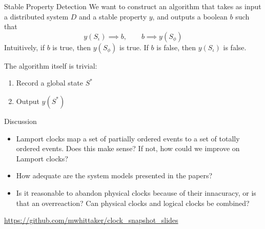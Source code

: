 \begin{frame}
  \begin{center}
    \scalebox{0.7}{
      \begin{tikzpicture}[xscale=3, yscale=1.5]
        \twotokensnap{}
      \end{tikzpicture}
    }
  \end{center}
\end{frame}

\begin{frame}{Stable Property Detection}
  We want to construct an algorithm that takes as input a distributed system
  $D$ and a stable property $y$, and outputs a boolean $b$ such that
  \[
    y(S_\iota) \implies b, \qquad b \implies y(S_\phi)
  \]
  Intuitively, if $b$ is true, then $y(S_\phi)$ is true. If $b$ is false, then
  $y(S_\iota)$ is false.

  \pause

  The algorithm itself is trivial:
  \begin{enumerate}
    \item Record a global state $S^*$
    \item Output $y(S^*)$
  \end{enumerate}
\end{frame}

\begin{frame}
  \begin{center}
  \end{center}
\end{frame}

\begin{frame}{Discussion}
  \pause
  \begin{itemize}
    \item Lamport clocks map a set of partially ordered events to a set of
      totally ordered events. Does this make sense? If not, how could we
      improve on Lamport clocks?
    \item How adequate are the system models presented in the papers?
    \item Is it reasonable to abandon physical clocks because of their
      innacuracy, or is that an overreaction? Can physical clocks and logical
      clocks be combined?
  \end{itemize}
\end{frame}

\begin{frame}
  \url{https://github.com/mwhittaker/clock\_snapshot\_slides}
\end{frame}

